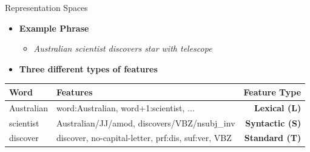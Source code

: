 \documentclass[10pt,=table]{beamer}
\begin{document}
\begin{frame}{Representation Spaces}
\hfill
\begin{itemize}
	\item[] \large \textbf{Example Phrase}
	\begin{itemize}
	\item[] \large \textit{Australian scientist discovers star with telescope}
	\end{itemize} 
\end{itemize}
\hfill
\begin{itemize}
\item[] \large \textbf{Three different types of features}
\end{itemize}

\small

\begin{tabular}{llr}

	\hline 
	 \textbf{Word} & \textbf{Features} & \textbf{Feature Type}\\ 
	\hline 
	\rowcolor{greenEric!70}	
	Australian & word:Australian, word+1:scientist, ...& \textbf{Lexical (L)}\\ 
	\rowcolor{orangeEric!70}	
	scientist  &  Australian/JJ/amod, discovers/VBZ/nsubj\_inv & \textbf{Syntactic (S)}\\ 
	\rowcolor{blue!30}
	discover &discover, no-capital-letter, prf:dis, suf:ver, VBZ & \textbf{Standard (T)}\\ 
	\hline 
\end{tabular} 
\vspace{\textheight}
\end{frame}


%	
%	
%	 
%
\end{document}

